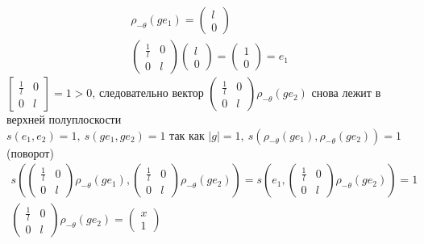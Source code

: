 	\begin{gather*}
		\rho_{-\theta}(ge_1) = 
		\begin{pmatrix}
			l \\ 0
		\end{pmatrix}\\
		\begin{pmatrix}
			\frac{1}{l} & 0\\
			0 & l
		\end{pmatrix}
		\begin{pmatrix}
			l \\ 0
		\end{pmatrix}
		=
		\begin{pmatrix}
			1 \\ 0
		\end{pmatrix}
		=
		e_1
	\end{gather*}
	$\begin{bmatrix}
		\frac{1}{l} & 0\\
		0 & l
	\end{bmatrix}
	= 1 > 0$, следовательно вектор 
	$\begin{pmatrix} \frac{1}{l} & 0 \\ 0 & l \end{pmatrix} \rho_{-\theta}(ge_2)$ снова лежит в верхней полуплоскости\\
	$s(e_1,e_2) = 1,\ s(ge_1,ge_2) = 1$ так как $|g| = 1,\ s(\rho_{-\theta}(ge_1),\rho_{-\theta}(ge_2)) = 1$ (поворот)
	\begin{gather*}
		s(\begin{pmatrix} \frac{1}{l} & 0 \\ 0 & l \end{pmatrix} \rho_{-\theta}(ge_1),
		\begin{pmatrix} \frac{1}{l} & 0 \\ 0 & l \end{pmatrix} \rho_{-\theta}(ge_2))
		=
		s(e_1,
		\begin{pmatrix} \frac{1}{l} & 0 \\ 0 & l \end{pmatrix}\rho_{-\theta}(ge_2)) = 1\\
		\begin{pmatrix} \frac{1}{l} & 0 \\ 0 & l \end{pmatrix}\rho_{-\theta}(ge_2) = \begin{pmatrix} x \\ 1 \end{pmatrix}
	\end{gather*}
